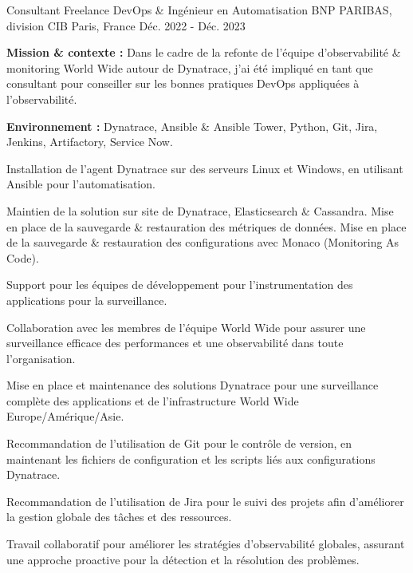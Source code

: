 \begin{cventries}
\cventry
{Consultant Freelance DevOps \& Ingénieur en Automatisation} %
{BNP PARIBAS, division CIB} %
{Paris, France} %
{Déc. 2022 - Déc. 2023} %
{
  \begin{cvitems}
    \item {\textbf{Mission \& contexte :} Dans le cadre de la refonte de l'équipe d'observabilité \& monitoring World Wide autour de Dynatrace, j'ai été impliqué en tant que consultant pour conseiller sur les bonnes pratiques DevOps appliquées à l'observabilité.}
    \item {\textbf{Environnement :} Dynatrace, Ansible \& Ansible Tower, Python, Git, Jira, Jenkins, Artifactory, Service Now.}
    \item {Installation de l'agent Dynatrace sur des serveurs Linux et Windows, en utilisant Ansible pour l'automatisation.}
    \item {Maintien de la solution sur site de Dynatrace, Elasticsearch \& Cassandra. Mise en place de la sauvegarde \& restauration des métriques de données. Mise en place de la sauvegarde \& restauration des configurations avec Monaco (Monitoring As Code).}
    \item {Support pour les équipes de développement pour l'instrumentation des applications pour la surveillance.}
    \item {Collaboration avec les membres de l'équipe World Wide pour assurer une surveillance efficace des performances et une observabilité dans toute l'organisation.}
    \item {Mise en place et maintenance des solutions Dynatrace pour une surveillance complète des applications et de l'infrastructure World Wide Europe/Amérique/Asie.}
    \item {Recommandation de l'utilisation de Git pour le contrôle de version, en maintenant les fichiers de configuration et les scripts liés aux configurations Dynatrace.}
    \item {Recommandation de l'utilisation de Jira pour le suivi des projets afin d'améliorer la gestion globale des tâches et des ressources.}
    \item {Travail collaboratif pour améliorer les stratégies d'observabilité globales, assurant une approche proactive pour la détection et la résolution des problèmes.}
  \end{cvitems}
}


\end{cventries}
